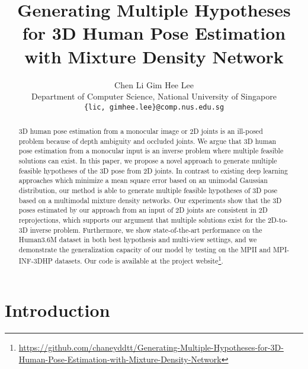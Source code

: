 \documentclass[10pt,twocolumn,letterpaper]{article}
\begin{document}
\title{Generating Multiple Hypotheses for 3D Human Pose Estimation\\ with Mixture Density Network}

\author{Chen Li \quad \quad Gim Hee Lee\\
Department of Computer Science, National University of Singapore\\
{\tt\small \{lic, gimhee.lee\}@comp.nus.edu.sg}
}

\maketitle


\begin{abstract}
  3D human pose estimation from a monocular image or 2D joints is an ill-posed problem because of depth ambiguity and occluded joints. We argue that 3D human pose estimation from a monocular input is an inverse problem where multiple feasible solutions can exist. In this paper, we propose a novel approach to generate multiple feasible hypotheses of the 3D pose from 2D joints.
  In contrast to existing deep learning approaches which minimize a mean square error based on an unimodal Gaussian distribution, our method is able to generate multiple feasible hypotheses of 3D pose based on a multimodal mixture density networks. Our experiments show that the 3D poses estimated by our approach from an input of 2D joints are consistent in 2D reprojections, which supports our argument that multiple solutions exist for the 2D-to-3D inverse problem. 
  Furthermore, we show state-of-the-art performance on the Human3.6M dataset in both best hypothesis and multi-view settings, and we demonstrate the generalization capacity of our model by testing on the MPII and MPI-INF-3DHP datasets. Our code is available at the project website\footnote{\url{https://github.com/chaneyddtt/Generating-Multiple-Hypotheses-for-3D-Human-Pose-Estimation-with-Mixture-Density-Network}}.
  
\end{abstract}

\section{Introduction}
\end{document}
